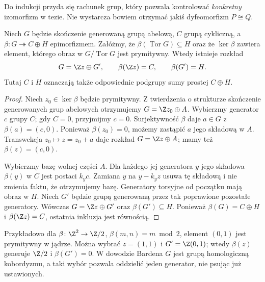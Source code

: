 Do indukcji przyda się rachunek grup,
który pozwala kontrolować
\emph{konkretny} izomorfizm w tezie. Nie
wystarcza bowiem otrzymać jakiś
dyfeomorfizm $P\cong Q$.

\begin{lemat}
\label{lem:barden-generator-24}
Niech $G$ będzie skończenie generowaną grupą
abelową, $C$ grupą cykliczną, a
$\beta\colon G\twoheadrightarrow C\oplus H$
epimorfizmem. Załóżmy, że
$\beta(\operatorname{Tor}G)\subseteq H$
oraz że $\ker\beta$ zawiera element,
którego obraz w $G/\operatorname{Tor}G$
jest prymitywny.
Wtedy istnieje rozkład
\[
G=\Z z\oplus G',\qquad
\beta(\Z z)=C,\qquad \beta(G')=H.
\]
Tutaj $C$ i $H$ oznaczają także odpowiednie
podgrupy sumy prostej $C\oplus H$.
\end{lemat}
\begin{proof}
Niech $z_0\in\ker\beta$ będzie prymitywny.
Z twierdzenia o strukturze skończenie
generowanych grup abelowych otrzymujemy
$G=\Z z_0\oplus A$. Wybierzmy generator
$c$ grupy $C$; gdy $C=0$, przyjmijmy $c=0$.
Surjektywność $\beta$ daje $a\in G$ z
$\beta(a)=(c,0)$. Ponieważ
$\beta(z_0)=0$, możemy zastąpić $a$ jego
składową w $A$. Transwekcja
$z_0\mapsto z=z_0+a$ daje rozkład
$G=\Z z\oplus A$; mamy też
$\beta(z)=(c,0)$.

Wybierzmy bazę wolnej części $A$.
Dla każdego jej generatora
$y$ jego składowa $\beta(y)$ w $C$ jest
postaci $k_yc$. Zamiana $y$ na
$y-k_yz$ usuwa tę składową i nie zmienia
faktu, że otrzymujemy bazę. Generatory
torsyjne od początku mają obraz w $H$.
Niech $G'$ będzie grupą generowaną przez
tak poprawione pozostałe generatory.
Wówczas $G=\Z z\oplus G'$ oraz
$\beta(G')\subseteq H$. Ponieważ
$\beta(G)=C\oplus H$ i $\beta(\Z z)=C$,
ostatnia inkluzja jest równością.
\end{proof}

Przykładowo dla
$\beta\colon\Z^2\to\Z/2$,
$\beta(m,n)=m\bmod 2$, element $(0,1)$
jest prymitywny w jądrze. Można wybrać
$z=(1,1)$ i $G'=\Z(0,1)$; wtedy
$\beta(z)$ generuje $\Z/2$ i
$\beta(G')=0$. W dowodzie Bardena $G$
jest grupą homologiczną kobordyzmu,
a taki wybór pozwala oddzielić jeden
generator, nie psując już ustawionych.

